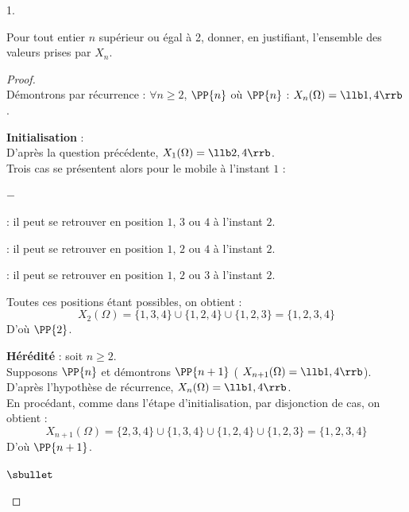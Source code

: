 \documentclass[11pt]{article}%
\begin{document}
\begin{noliste}{1.}
  \newpage


\item Pour tout entier $n$ supérieur ou égal à 2, donner, en
  justifiant, l'ensemble des valeurs prises par $X_{n}$.

  \begin{proof}~\\%
    Démontrons par récurrence : $\forall n \geq 2$, $\PP{n}$ \quad
    où \quad $\PP{n}$ : $X_n(\Omega) = \llb 1, 4\rrb$.
    \begin{noliste}{\fitem}
    \item {\bf Initialisation} :\\
      D'après la question précédente, $X_1(\Omega) = \llb 2,
      4\rrb$.\\
      Trois cas se présentent alors pour le mobile à l'instant $1$ :
      \begin{noliste}{$-$}
      \item {} : il peut se
        retrouver en position $1$, $3$ ou $4$ à l'instant $2$.
      \item {} : il peut se
        retrouver en position $1$, $2$ ou $4$ à l'instant $2$.
      \item {} : il peut se
        retrouver en position $1$, $2$ ou $3$ à l'instant $2$.        
      \end{noliste}
      Toutes ces positions étant possibles, on obtient :
      \[
      X_2(\Omega) = \{1, 3, 4\} \cup \{1, 2, 4\} \cup \{1, 2, 3\} =
      \{1, 2, 3, 4\}
      \]
      D'où $\PP{2}$.
    \item {\bf Hérédité} : soit $n \geq 2$.\\
      Supposons $\PP{n}$ et démontrons $\PP{n+1}$ (\ie
      $X_{n+1}(\Omega) = \llb 1, 4\rrb$).\\[.2cm]
      D'après l'hypothèse de récurrence, $X_n(\Omega) = \llb 1, 4
      \rrb$. \\
      En procédant, comme dans l'étape d'initialisation, par
      disjonction de cas, on obtient :
      \[
      X_{n+1}(\Omega) = \{2, 3, 4\} \cup \{1, 3, 4\} \cup \{1, 2, 4\}
      \cup \{1, 2, 3\} = \{1, 2, 3, 4\}
      \]
      D'où $\PP{n+1}$.
    \end{noliste}
    \begin{remark}%
      \begin{noliste}{$\sbullet$}

\end{noliste}
\end{remark}
\end{proof}
\end{noliste}
\end{document}
